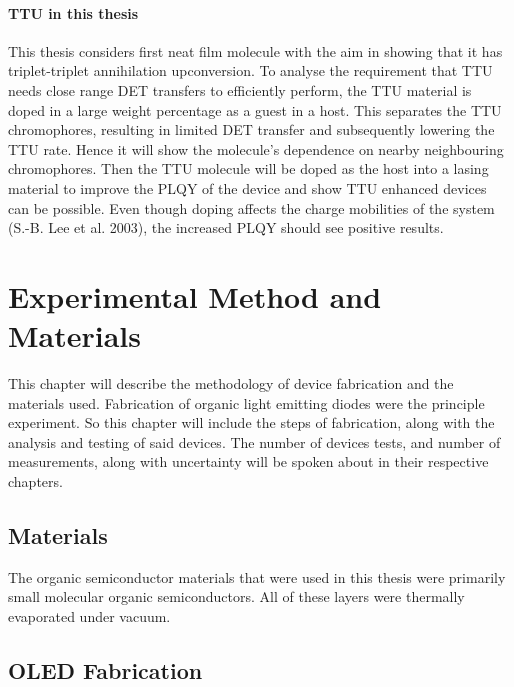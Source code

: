 \documentclass[
  letterpaper,
  DIV=11,
  numbers=noendperiod,
  oneside]{scrreprt}
\begin{document}
\hypertarget{ttu-in-this-thesis}{%
\subsubsection{TTU in this thesis}\label{ttu-in-this-thesis}}

This thesis considers first neat film molecule with the aim in showing
that it has triplet-triplet annihilation upconversion. To analyse the
requirement that TTU needs close range DET transfers to efficiently
perform, the TTU material is doped in a large weight percentage as a
guest in a host. This separates the TTU chromophores, resulting in
limited DET transfer and subsequently lowering the TTU rate. Hence it
will show the molecule's dependence on nearby neighbouring chromophores.
Then the TTU molecule will be doped as the host into a lasing material
to improve the PLQY of the device and show TTU enhanced devices can be
possible. Even though doping affects the charge mobilities of the system
(S.-B. Lee et al. 2003), the increased PLQY should see positive results.


\hypertarget{experimental-method-and-materials}{%
\chapter[ Experimental Method and
Materials]{\texorpdfstring{\protect\hypertarget{sec:exp}{}{}
Experimental Method and
Materials}{ Experimental Method and Materials}}\label{experimental-method-and-materials}}

This chapter will describe the methodology of device fabrication and the
materials used. Fabrication of organic light emitting diodes were the
principle experiment. So this chapter will include the steps of
fabrication, along with the analysis and testing of said devices. The
number of devices tests, and number of measurements, along with
uncertainty will be spoken about in their respective chapters.

\hypertarget{materials}{%
\section{Materials}\label{materials}}

The organic semiconductor materials that were used in this thesis were
primarily small molecular organic semiconductors. All of these layers
were thermally evaporated under vacuum.

\hypertarget{oled-fabrication}{%
\section{OLED Fabrication}\label{oled-fabrication}}
\end{document}
